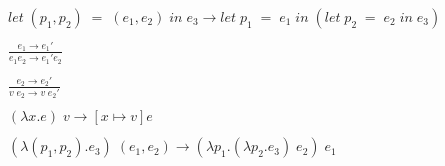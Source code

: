 \documentclass[10pt,a4paper,draft]{article}
\begin{document}
\begin{flushleft}
\begin{align*}
\tag{E-PatternMatch}
&let \; (p_{1},p_{2}) \; = \; (e_{1},e_{2}) \; in \; e_{3} \rightarrow
let \; p_{1} \; = \; e_{1} \; in \;
(let \; p_{2}  \; = \; e_{2} \; in \; e_{3}) \\ \\
\tag{E-App1}
&\frac{e_{1} \rightarrow e_{1}'}
{e_{1} e_{2} \rightarrow e_{1}' e_{2}}\\ \\
\tag{E-App2}
&\frac{e_{2} \rightarrow e_{2}'}
{v\;e_{2} \rightarrow v\;e_{2}'}\\ \\
\tag{E-Lambda}
&(\lambda x . e) \; v \rightarrow [x \mapsto v]e \\ \\
\tag{E-MatchLambda}
&(\lambda (p_{1},p_{2}) . e_{3}) \; (e_{1},e_{2}) \rightarrow (\lambda p_{1}.(\lambda p_{2}.e_{3})\;e_{2})\; e_{1}
\end{align*}
\end{flushleft}
\end{document}
